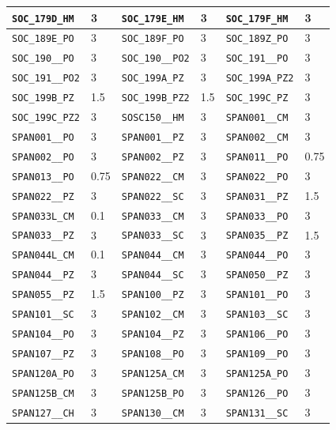 \begin{longtable}{|l|l||l|l||l|l|}
    \verb|SOC_179D_HM| & 3 & \verb|SOC_179E_HM| & 3 & \verb|SOC_179F_HM| & 3\\\hline
    \verb|SOC_189E_PO| & 3 & \verb|SOC_189F_PO| & 3 & \verb|SOC_189Z_PO| & 3\\\hline
    \verb|SOC_190__PO| & 3 & \verb|SOC_190__PO2| & 3 & \verb|SOC_191__PO| & 3\\\hline
    \verb|SOC_191__PO2| & 3 & \verb|SOC_199A_PZ| & 3 & \verb|SOC_199A_PZ2| & 3\\\hline
    \verb|SOC_199B_PZ| & 1.5 & \verb|SOC_199B_PZ2| & 1.5 & \verb|SOC_199C_PZ| & 3\\\hline
    \verb|SOC_199C_PZ2| & 3 & \verb|SOSC150__HM| & 3 & \verb|SPAN001__CM| & 3\\\hline
    \verb|SPAN001__PO| & 3 & \verb|SPAN001__PZ| & 3 & \verb|SPAN002__CM| & 3\\\hline
    \verb|SPAN002__PO| & 3 & \verb|SPAN002__PZ| & 3 & \verb|SPAN011__PO| & 0.75\\\hline
    \verb|SPAN013__PO| & 0.75 & \verb|SPAN022__CM| & 3 & \verb|SPAN022__PO| & 3\\\hline
    \verb|SPAN022__PZ| & 3 & \verb|SPAN022__SC| & 3 & \verb|SPAN031__PZ| & 1.5\\\hline
    \verb|SPAN033L_CM| & 0.1 & \verb|SPAN033__CM| & 3 & \verb|SPAN033__PO| & 3\\\hline
    \verb|SPAN033__PZ| & 3 & \verb|SPAN033__SC| & 3 & \verb|SPAN035__PZ| & 1.5\\\hline
    \verb|SPAN044L_CM| & 0.1 & \verb|SPAN044__CM| & 3 & \verb|SPAN044__PO| & 3\\\hline
    \verb|SPAN044__PZ| & 3 & \verb|SPAN044__SC| & 3 & \verb|SPAN050__PZ| & 3\\\hline
    \verb|SPAN055__PZ| & 1.5 & \verb|SPAN100__PZ| & 3 & \verb|SPAN101__PO| & 3\\\hline
    \verb|SPAN101__SC| & 3 & \verb|SPAN102__CM| & 3 & \verb|SPAN103__SC| & 3\\\hline
    \verb|SPAN104__PO| & 3 & \verb|SPAN104__PZ| & 3 & \verb|SPAN106__PO| & 3\\\hline
    \verb|SPAN107__PZ| & 3 & \verb|SPAN108__PO| & 3 & \verb|SPAN109__PO| & 3\\\hline
    \verb|SPAN120A_PO| & 3 & \verb|SPAN125A_CM| & 3 & \verb|SPAN125A_PO| & 3\\\hline
    \verb|SPAN125B_CM| & 3 & \verb|SPAN125B_PO| & 3 & \verb|SPAN126__PO| & 3\\\hline
    \verb|SPAN127__CH| & 3 & \verb|SPAN130__CM| & 3 & \verb|SPAN131__SC| & 3\\\hline

\end{longtable}
